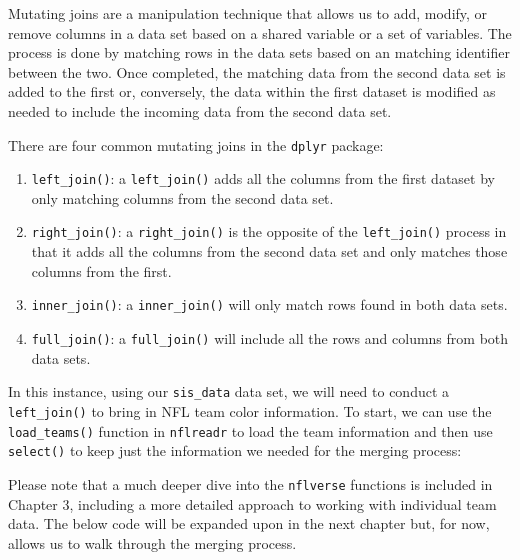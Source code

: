 \documentclass[
  letterpaper,
]{krantz}
\providecommand{\tightlist}{%
  \setlength{\itemsep}{0pt}\setlength{\parskip}{0pt}}\usepackage{longtable,booktabs,array}
\begin{document}
Mutating joins are a manipulation technique that allows us to add,
modify, or remove columns in a data set based on a shared variable or a
set of variables. The process is done by matching rows in the data sets
based on an matching identifier between the two. Once completed, the
matching data from the second data set is added to the first or,
conversely, the data within the first dataset is modified as needed to
include the incoming data from the second data set.

There are four common mutating joins in the \texttt{dplyr} package:

\begin{enumerate}
\def\labelenumi{\arabic{enumi}.}
\tightlist
\item
  \texttt{left\_join()}: a \texttt{left\_join()} adds all the columns
  from the first dataset by only matching columns from the second data
  set.
\item
  \texttt{right\_join()}: a \texttt{right\_join()} is the opposite of
  the \texttt{left\_join()} process in that it adds all the columns from
  the second data set and only matches those columns from the first.
\item
  \texttt{inner\_join()}: a \texttt{inner\_join()} will only match rows
  found in both data sets.
\item
  \texttt{full\_join()}: a \texttt{full\_join()} will include all the
  rows and columns from both data sets.
\end{enumerate}

In this instance, using our \texttt{sis\_data} data set, we will need to
conduct a \texttt{left\_join()} to bring in NFL team color information.
To start, we can use the \texttt{load\_teams()} function in
\texttt{nflreadr} to load the team information and then use
\texttt{select()} to keep just the information we needed for the merging
process:

\begin{tcolorbox}[enhanced jigsaw, colback=white, leftrule=.75mm, breakable, colframe=quarto-callout-note-color-frame, bottomtitle=1mm, rightrule=.15mm, left=2mm, opacityback=0, bottomrule=.15mm, arc=.35mm, coltitle=black, colbacktitle=quarto-callout-note-color!10!white, toptitle=1mm, titlerule=0mm, title=\textcolor{quarto-callout-note-color}{\faInfo}\hspace{0.5em}{Note}, toprule=.15mm, opacitybacktitle=0.6]

Please note that a much deeper dive into the \texttt{nflverse} functions
is included in Chapter 3, including a more detailed approach to working
with individual team data. The below code will be expanded upon in the
next chapter but, for now, allows us to walk through the merging
process.

\end{tcolorbox}
\end{document}
